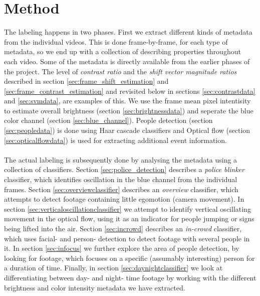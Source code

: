 \section{Method}
%
The labeling happens in two phases. First we extract different kinds of metadata from the individual videos. This is done frame-by-frame, for each type of metadata, so we end up with a collection of describing properties throughout each video. Some of the metadata is directly available from the earlier phases of the project. The level of \textit{contrast ratio} and the \textit{shift vector magnitude ratios} described in section \ref{sec:frame_shift_estimation} and \ref{sec:frame_contrast_estimation} and revisited below in sections \ref{sec:contrastdata} and \ref{sec:svmdata}, are examples of this. We use the frame mean pixel intentisity to estimate overall brightness (section \ref{sec:brightnessdata}) and seperate the blue color channel (section \ref{sec:blue_channel}). People detection (section \ref{sec:peopledata}) is done using Haar cascade classifiers and Optical flow (section \ref{sec:opticalflowdata}) is used for extracting additional event information.\\
\\
The actual labeling is subsequently done by analysing the metadata using a collection of classifiers. Section \ref{sec:police_detection} describes a \textit{police blinker} classifier, which identifies oscillation in the blue channel from the individual frames. Section \ref{sec:overviewclassifier} describes an \textit{overview} classifier, which attempts to detect footage containing little egomotion (camera movement). In section \ref{sec:verticaloscillationclassifier} we attempt to identify vertical oscillating movement in the optical flow, using it as an indicator for people jumping or signs being lifted into the air. Section \ref{sec:incrowd} describes an \textit{in-crowd} classifier, which uses facial- and person- detection to detect footage with several people in it. In section \ref{sec:infocus} we further explore the area of people detection, by looking for footage, which focuses on a specific (assumably interesting) person for a duration of time. Finally, in section \ref{sec:daynightclassifier} we look at differentiating between day- and night- time footage by working with the different brightness and color intensity metadata we have extracted.
%
